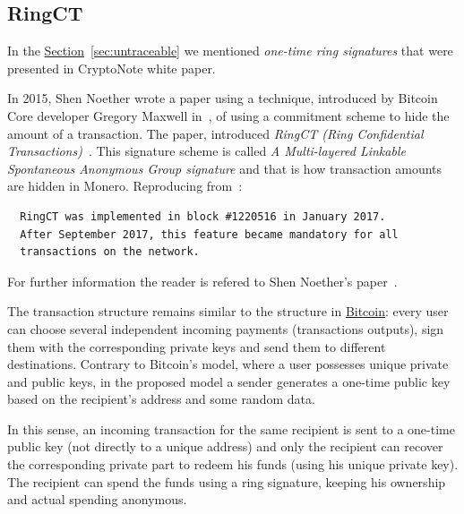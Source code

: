 \subsection{RingCT}
In the \hyperref[sec:untraceable]{Section}~\ref{sec:untraceable} we mentioned \emph{one-time ring signatures} that were presented in CryptoNote white paper.

In 2015, Shen Noether wrote a paper using a technique, introduced by Bitcoin Core developer Gregory Maxwell in~\cite{elements}, of using a commitment scheme to hide the amount of a transaction. The paper, introduced \emph{RingCT (Ring Confidential Transactions)}~\cite{ringCT}. This signature scheme is called \emph{A Multi-layered Linkable Spontaneous Anonymous Group signature} and that is how transaction amounts are hidden in Monero. Reproducing from~\cite{getmonero}:

\begin{verbatim}
  RingCT was implemented in block #1220516 in January 2017.
  After September 2017, this feature became mandatory for all
  transactions on the network.
\end{verbatim}
For further information the reader is refered to Shen Noether's paper~\cite{ringCT}.

The transaction structure remains similar to the structure in \hyperref[sec:Bitcoin]{Bitcoin}: every user can choose several independent incoming payments (transactions outputs), sign them with the corresponding private keys and send them to different destinations. Contrary to Bitcoin’s model, where a user possesses unique private and public keys, in the proposed model a sender generates a one-time public key based on the recipient’s address and some random data.

In this sense, an incoming transaction for the same recipient is sent to a one-time public key (not directly  to a unique  address) and only the recipient can recover the corresponding private part to redeem his funds (using his unique private key). The recipient can spend the funds using a ring signature, keeping his ownership and actual spending anonymous.
\clearpage
\pagebreak

